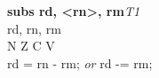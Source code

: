 


\begin{instructionblock}{\imagewidth}%
    \textbf{subs rd, <rn>, rm}\hfill\textit{T1}\\
    rd, rn, rm \baseregisters\\
    {N Z C V}\\
    rd = rn - rm; \textit{or} rd -= rm;
\end{instructionblock}

